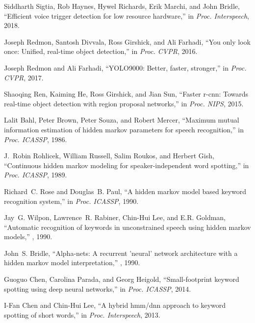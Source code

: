 \documentclass{article}
\begin{document}
\begin{thebibliography}{10}

Siddharth Sigtia, Rob Haynes, Hywel Richards, Erik Marchi, and John Bridle,
\newblock ``Efficient voice trigger detection for low resource hardware,''
\newblock in {\em Proc. Interspeech}, 2018.

Joseph Redmon, Santosh Divvala, Ross Girshick, and Ali Farhadi,
\newblock ``You only look once: Unified, real-time object detection,''
\newblock in {\em Proc. CVPR}, 2016.

Joseph Redmon and Ali Farhadi,
\newblock ``{YOLO9000}: Better, faster, stronger,''
\newblock in {\em Proc. CVPR}, 2017.

Shaoqing Ren, Kaiming He, Ross Girshick, and Jian Sun,
\newblock ``Faster r-cnn: Towards real-time object detection with region
  proposal networks,''
\newblock in {\em Proc. NIPS}, 2015.

Lalit Bahl, Peter Brown, Peter Souza, and Robert Mercer,
\newblock ``Maximum mutual information estimation of hidden markov parameters
  for speech recognition,''
\newblock in {\em Proc. ICASSP}, 1986.

J.~Robin Rohlicek, William Russell, Salim Roukos, and Herbert Gish,
\newblock ``Continuous hidden markov modeling for speaker-independent word
  spotting,''
\newblock in {\em Proc. ICASSP}, 1989.

Richard~C. Rose and Douglas~B. Paul,
\newblock ``A hidden markov model based keyword recognition system,''
\newblock in {\em Proc. ICASSP}, 1990.

Jay~G. Wilpon, Lawrence~R. Rabiner, Chin-Hui Lee, and E.R. Goldman,
\newblock ``Automatic recognition of keywords in unconstrained speech using
  hidden markov models,''
,
  1990.

John~S. Bridle,
\newblock ``Alpha-nets: {A} recurrent 'neural' network architecture with a
  hidden markov model interpretation,''
, 1990.

Guoguo Chen, Carolina Parada, and Georg Heigold,
\newblock ``Small-footprint keyword spotting using deep neural networks,''
\newblock in {\em Proc. ICASSP}, 2014.

I-Fan Chen and Chin-Hui Lee,
\newblock ``A hybrid hmm/dnn approach to keyword spotting of short words,''
\newblock in {\em Proc. Interspeech}, 2013.


\end{thebibliography}
\end{document}
